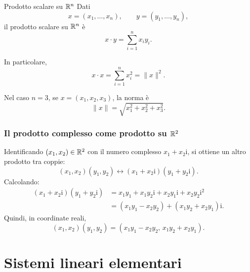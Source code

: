 \documentclass[a4paper]{article}
\begin{document}
\begin{snippetdefinition}{Prodotto scalare su \(\mathbb{R}^n\)}
    Dati
    \[
        x=(x_1,\ldots,x_n),
        \qquad
        y=(y_1,\ldots,y_n),
    \]
    il prodotto scalare su \(\mathbb{R}^n\) è
    \[
        x\cdot y = \sum_{i=1}^{n} x_i y_i.
    \]
\end{snippetdefinition}

In particolare,
\[
    x\cdot x
    =
    \sum_{i=1}^{n} x_i^2
    =
    \|x\|^2.
\]

Nel caso \(n=3\), se \(x=(x_1,x_2,x_3)\), la norma è
\[
    \|x\|
    =
    \sqrt{x_1^2+x_2^2+x_3^2}.
\]

\begin{center}
\end{center}

\subsubsection{Il prodotto complesso come prodotto su \texorpdfstring{\(\mathbb{R}^2\)}{R2}}

Identificando \((x_1,x_2)\in\mathbb{R}^2\) con il numero complesso \(x_1+x_2\mathrm{i}\), si ottiene un altro prodotto tra coppie:
\[
    (x_1,x_2)(y_1,y_2)
    \longleftrightarrow
    (x_1+x_2\mathrm{i})(y_1+y_2\mathrm{i}).
\]
Calcolando:
\begin{align*}
    (x_1+x_2\mathrm{i})(y_1+y_2\mathrm{i})
    &= x_1y_1+x_1y_2\mathrm{i}+x_2y_1\mathrm{i}+x_2y_2\mathrm{i}^2 \\
    &= (x_1y_1-x_2y_2)+(x_1y_2+x_2y_1)\mathrm{i}.
\end{align*}
Quindi, in coordinate reali,
\[
    (x_1,x_2)(y_1,y_2)
    =
    (x_1y_1-x_2y_2,\,
    x_1y_2+x_2y_1).
\]

\section{Sistemi lineari elementari}
\end{document}
